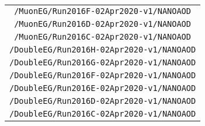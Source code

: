 \begin{table}[!h]
\begin{center}
{\begin{tabular}{c}
\texttt{/MuonEG/Run2016F-02Apr2020-v1/NANOAOD} \\ 
\texttt{/MuonEG/Run2016D-02Apr2020-v1/NANOAOD} \\ 
\texttt{/MuonEG/Run2016C-02Apr2020-v1/NANOAOD} \\ 
\texttt{/DoubleEG/Run2016H-02Apr2020-v1/NANOAOD} \\ 
\texttt{/DoubleEG/Run2016G-02Apr2020-v1/NANOAOD} \\ 
\texttt{/DoubleEG/Run2016F-02Apr2020-v1/NANOAOD} \\ 
\texttt{/DoubleEG/Run2016E-02Apr2020-v1/NANOAOD} \\ 
\texttt{/DoubleEG/Run2016D-02Apr2020-v1/NANOAOD} \\ 
\texttt{/DoubleEG/Run2016C-02Apr2020-v1/NANOAOD} \\ 

\hline
\end{tabular}
} %
\end{center}
\end{table}

